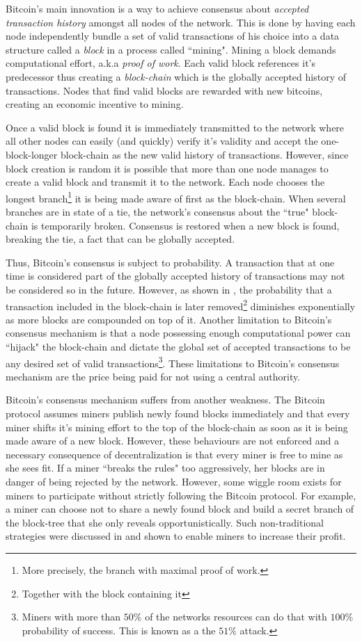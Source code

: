 \documentclass[letterpaper,12pt]{report}
\begin{document}
Bitcoin's main innovation is a way to achieve consensus about \emph{accepted transaction history} amongst all nodes of the network. This is done by having each node independently bundle a set of valid transactions of his choice into a data structure called a \textit{block} in a process called ``mining". Mining a block demands computational effort, a.k.a \textit{proof of work}. Each valid block references it's predecessor thus creating a \textit{block-chain} which is the globally accepted history of transactions. Nodes that find valid blocks are rewarded with new bitcoins, creating an economic incentive to mining.

Once a valid block is found it is immediately transmitted to the network where all other nodes can easily (and quickly) verify it's validity and accept the one-block-longer block-chain as the new valid history of transactions. However, since block creation is random it is possible that more than one node manages to create a valid block and transmit it to the network. Each node chooses the longest branch\footnote{More precisely, the branch with maximal proof of work.} it is being made aware of first as the block-chain. When several branches are in state of a tie, the network's consensus about the ``true" block-chain is temporarily broken. Consensus is restored when a new block is found, breaking the tie, a fact that can be globally accepted. 

Thus, Bitcoin's consensus is subject to probability. A transaction that at one time is considered part of the globally accepted history of transactions may not be considered so in the future. However, as shown in \cite{Bitcoin}, the probability that a transaction included in the block-chain is later removed\footnote{Together with the block containing it} diminishes exponentially as more blocks are compounded on top of it. Another limitation to Bitcoin's consensus mechanism is that a node possessing enough computational power can ``hijack" the block-chain and dictate the global set of accepted transactions to be any desired set of valid transactions\footnote{Miners with more than $50\%$ of the networks resources can do that with $100\%$ probability of success. This is known as a the $51\%$ attack.}. These limitations to Bitcoin's consensus mechanism are the price being paid for not using a central authority. 

Bitcoin's consensus mechanism suffers from another weakness. The Bitcoin protocol assumes miners publish newly found blocks immediately and that every miner shifts it's mining effort to the top of the block-chain as soon as it is being made aware of a new block. However, these behaviours are not enforced and a necessary consequence of decentralization is that every miner is free to mine as she sees fit. If a miner ``breaks the rules" too aggressively, her blocks are in danger of being rejected by the network. However, some wiggle room exists for miners to participate without strictly following the Bitcoin protocol. For example, a miner can choose not to share a newly found block and build a secret branch of the block-tree that she only reveals opportunistically. Such non-traditional strategies were discussed in \cite{Selfish,Lear} and shown to enable miners to increase their profit. 
\end{document}
